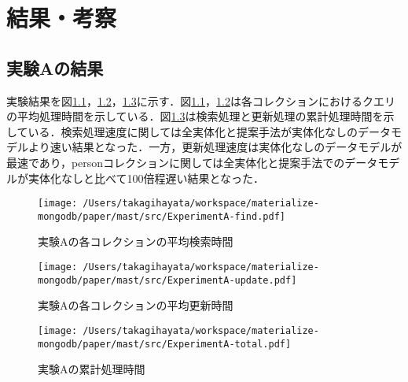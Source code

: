 \documentclass[a4paper,11pt]{ujreport}
\begin{document}
\chapter{結果・考察}
\label{chap:Result}
\section{実験Aの結果}
実験結果を図\ref{ExperimentA-find}，\ref{ExperimentA-update}，\ref{ExperimentA-total}に示す．図\ref{ExperimentA-find}，\ref{ExperimentA-update}は各コレクションにおけるクエリの平均処理時間を示している．図\ref{ExperimentA-total}は検索処理と更新処理の累計処理時間を示している．検索処理速度に関しては全実体化と提案手法が実体化なしのデータモデルより速い結果となった．一方，更新処理速度は実体化なしのデータモデルが最速であり，personコレクションに関しては全実体化と提案手法でのデータモデルが実体化なしと比べて100倍程遅い結果となった．
\begin{figure}[htbp]
	\begin{center}
		\texttt{[image: /Users/takagihayata/workspace/materialize-mongodb/paper/mast/src/ExperimentA-find.pdf]} %
	\end{center}
	\caption{実験Aの各コレクションの平均検索時間}
	\label{ExperimentA-find}
\end{figure}
\begin{figure}[htbp]
	\begin{center}
		\texttt{[image: /Users/takagihayata/workspace/materialize-mongodb/paper/mast/src/ExperimentA-update.pdf]} %
	\end{center}
	\caption{実験Aの各コレクションの平均更新時間}
	\label{ExperimentA-update}
\end{figure}
\begin{figure}[htbp]
	\begin{center}
		\texttt{[image: /Users/takagihayata/workspace/materialize-mongodb/paper/mast/src/ExperimentA-total.pdf]} %
	\end{center}
	\caption{実験Aの累計処理時間}
	\label{ExperimentA-total}
\end{figure}
\end{document}

